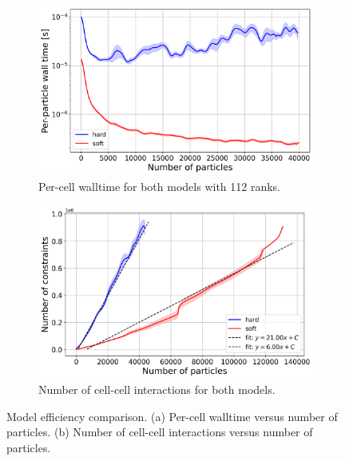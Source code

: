 \documentclass[conference]{IEEEtran}
\begin{document}
\begin{figure}[h]
    \centering
    \begin{subfigure}[b]{0.9\linewidth}
        \centering
        \includegraphics[width=\linewidth]{figures/comparison_plots/combined_num_particles_vs_wall_time_per_particle_with_fit.png}
        \caption{Per-cell walltime for both models with 112 ranks.}
        \label{fig:walltime_per_particle}
    \end{subfigure}

    \begin{subfigure}[b]{0.9\linewidth}
        \centering
        \includegraphics[width=\linewidth]{figures/comparison_plots/combined_num_constraints_vs_num_particles_with_fit.png}
        \caption{Number of cell-cell interactions for both models.}
        \label{fig:num_constraints}
    \end{subfigure}

    \caption{Model efficiency comparison. (a) Per-cell walltime versus number of particles. (b) Number of cell-cell interactions versus number of particles.}
    \label{fig:comparison_metrics}
\end{figure}
\end{document}
